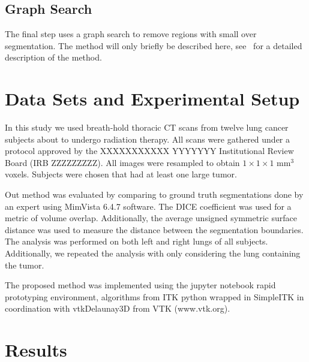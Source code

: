 \documentclass{llncs}
\begin{document}
\subsection{Graph Search}
%
The final step uses a graph search to remove regions with small over segmentation. The method will only briefly be described here, see~\cite{li2006} for a detailed description of the method. 
%
\section{Data Sets and Experimental Setup}
%
In this study we used breath-hold thoracic CT scans from twelve lung cancer subjects about to undergo radiation therapy. All scans were gathered under a protocol approved by the 
XXXXXXXXXXX YYYYYYY 
Institutional Review Board 
(IRB ZZZZZZZZZ).
All images were resampled to obtain $1\times{}1\times{}1$ mm$^3$ voxels. Subjects were chosen that had at least one large tumor. 

Out method was evaluated by comparing to ground truth segmentations done by an expert using MimVista 6.4.7 software. The DICE coefficient was used for a metric of volume overlap. Additionally, the average unsigned symmetric surface distance was used to measure the distance between the segmentation boundaries. The analysis was performed on both left and right lungs of all subjects. Additionally, we repeated the analysis with only considering the lung containing the tumor.


The proposed method was implemented using the jupyter notebook \cite{PER-GRA:2007} rapid prototyping environment,  algorithms from ITK\cite{johnson2015itk} python wrapped in SimpleITK \cite{10.3389/fninf.2013.00045} in coordination with vtkDelaunay3D from VTK (www.vtk.org).


%
\section{Results}
%
\end{document}
